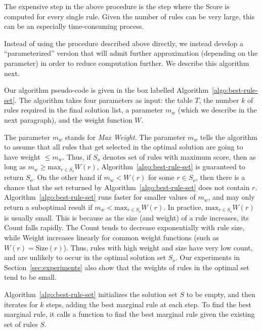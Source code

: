 The expensive step in the above procedure is the step where the Score is computed for every
single rule. Given the number of rules can be very large, this can be an especially time-consuming process.

Instead of using the procedure described above directly, we instead develop a ``parameterized'' version 
that will admit further approximation (depending on the parameter) in order to reduce computation further. We describe
this algorithm next.

 Our algorithm pseudo-code is given in the box labelled Algorithm~\ref{algo:best-rule-set}. The algorithm takes four parameters as input: the table $T$, the number $k$ of rules required in the final solution list, a parameter $m_w$ (which we describe in the next paragraph), and the weight function $W$. 

The parameter $m_w$ stands for \textit{Max Weight}. The parameter $m_w$ tells the algorithm to assume that all rules that get selected in the optimal solution are going to have weight $\leq m_w$. Thus, if $S_o$ denotes set of rules with maximum score, then as long as $m_w \geq \textrm{max}_{r \in S_o}W(r)$, Algorithm~\ref{algo:best-rule-set} is guaranteed to return $S_o$. On the other hand if $m_w < W(r)$ for some $r \in S_o$, then there is a chance that the set returned by Algorithm~\ref{algo:best-rule-set} does not contain $r$. Algorithm~\ref{algo:best-rule-set} runs faster for smaller values of $m_w$, and may only return a suboptimal result if $m_w < \textrm{max}_{r \in S_o}W(r)$. In practice, $\textrm{max}_{r \in S_o}W(r)$ is usually small. This is because as the size (and weight) of a rule increases, its Count falls rapidly. The Count tends to decrease exponentially with rule size, while Weight increases linearly for common weight functions (such as $W(r) = \text{Size}(r)$). Thus, rules with high weight and size have very low count, and are unlikely to occur in the optimal solution set $S_o$. Our experiments in Section~\ref{sec:experiments} also show that the weights of rules in the optimal set tend to be small.


Algorithm~\ref{algo:best-rule-set} initializes the solution set $S$ to be empty, and then iterates for $k$ steps, adding the best marginal rule at each step. To find the best marginal rule, it calls a function to find the best marginal rule given the existing set of rules $S$. 

